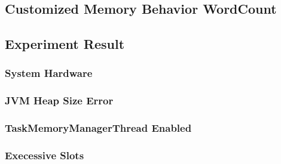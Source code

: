 \subsection{Customized Memory Behavior WordCount}


\subsection{Experiment Result}

\subsubsection{System Hardware}


\subsubsection{JVM Heap Size Error}


\subsubsection{TaskMemoryManagerThread Enabled}


\subsubsection{Execessive Slots}
